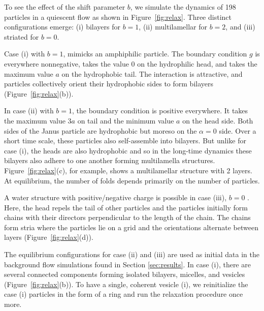\documentclass[aps,prl,preprint,groupedaddress]{revtex4-2}
\begin{document}
To see the effect of the shift parameter $b$, we simulate the dynamics of
198 particles in a quiescent flow as shown in Figure~\ref{fig:relax}.
Three distinct configurations emerge:
(i) bilayers for $b = 1$, 
(ii) multilamellar for $b = 2$, and 
(iii) striated for $b = 0$.

Case (i) with $b = 1$, mimicks an amphiphilic particle.
The boundary condition $g$ is everywhere nonnegative,
takes the value $0$ on the
hydrophilic head,
and takes the maximum value $a$ on the
hydrophobic tail. 
The interaction is attractive, and particles collectively orient their
hydrophobic sides to form bilayers  (Figure~\ref{fig:relax}(b)). 

In case (ii) with $b = 1$, the boundary condition is positive everywhere.
It takes the maximum value $3a$ on tail and the
minimum value $a$ on the head side. 
Both sides of the Janus particle are hydrophobic but
moreso on the $\alpha = 0$ side.  
Over a short time scale, these particles also self-assemble into bilayers. But unlike for case (i),
the heads are also hydrophobic and so in the long-time dynamics
these bilayers also adhere to one another 
forming multilamella structures. Figure~\ref{fig:relax}(c), for example, shows a
multilamellar structure with 2 layers.
At equilibrium, the number of folds depends primarily on the number of particles.

A water structure with
positive/negative charge is possible in case (iii), $b = 0$
\cite{MaRa76, Ma77}.
Here, the head repels the tail of other particles
and the particles initially form chains with their directors perpendicular
to the length of the chain.  
The chains form stria
where the particles lie on a 
grid and the orientations alternate between layers (Figure~\ref{fig:relax}(d)).

The equilibrium configurations for case (ii) and (iii) are used as initial data in the
background flow simulations found in Section \ref{sec:results}.
In case (i), there are several connected
components forming isolated bilayers, micelles, and vesicles (Figure~\ref{fig:relax}(b)).
To have a single, coherent vesicle (i), we reinitialize
the case (i) particles in the form of a ring and run the relaxation procedure once more.
\end{document}
